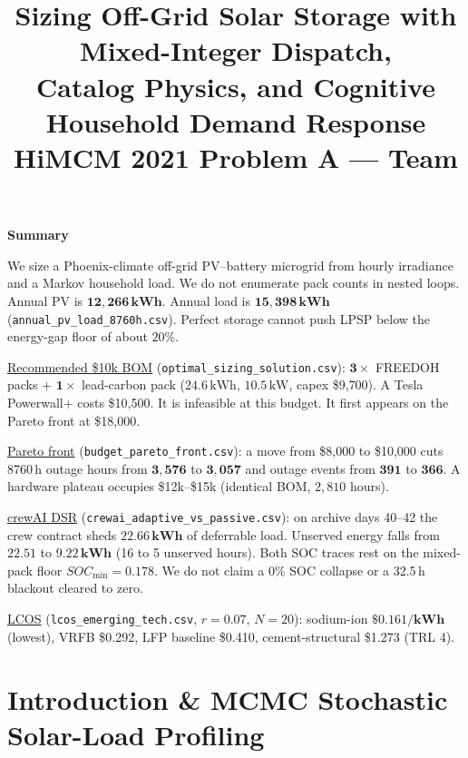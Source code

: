 \documentclass[12pt]{article}
\title{\textbf{Sizing Off-Grid Solar Storage with Mixed-Integer Dispatch,\\
Catalog Physics, and Cognitive Household Demand Response}\\[0.4em]
\large HiMCM 2021 Problem A --- Team \TeamNumber}
\author{}
\date{}
\begin{document}
\maketitle
\thispagestyle{empty}

\begin{center}
{\Large \textbf{Summary}}
\end{center}

\noindent
We size a Phoenix-climate off-grid PV--battery microgrid from hourly
irradiance and a Markov household load. We do not enumerate pack counts
in nested loops. Annual PV is \(\mathbf{12{,}266\,kWh}\). Annual load is
\(\mathbf{15{,}398\,kWh}\)
(\texttt{annual\_pv\_load\_8760h.csv}). Perfect storage cannot push LPSP
below the energy-gap floor of about \(20\%\).

\underline{Recommended \$10k BOM}
(\texttt{optimal\_sizing\_solution.csv}):
\(\mathbf{3\times}\) FREEDOH packs \(+\) \(\mathbf{1\times}\) lead-carbon
pack (\(24.6\,\mathrm{kWh}\), \(10.5\,\mathrm{kW}\), capex \$9{,}700).
A Tesla Powerwall+ costs \$10{,}500. It is infeasible at this budget.
It first appears on the Pareto front at \$18{,}000.

\underline{Pareto front} (\texttt{budget\_pareto\_front.csv}):
a move from \$8{,}000 to \$10{,}000 cuts 8760\,h outage hours from
\(\mathbf{3{,}576}\) to \(\mathbf{3{,}057}\) and outage events from
\(\mathbf{391}\) to \(\mathbf{366}\). A hardware plateau occupies
\$12k--\$15k (identical BOM, \(2{,}810\) hours).

\underline{crewAI DSR} (\texttt{crewai\_adaptive\_vs\_passive.csv}):
on archive days 40--42 the crew contract sheds
\(\mathbf{22.66\,kWh}\) of deferrable load. Unserved energy falls from
\(\mathbf{22.51}\) to \(\mathbf{9.22\,kWh}\) (16 to 5 unserved hours).
Both SOC traces rest on the mixed-pack floor \(SOC_{\min}=0.178\).
We do not claim a 0\% SOC collapse or a 32.5\,h blackout cleared to zero.

\underline{LCOS} (\texttt{lcos\_emerging\_tech.csv}, \(r=0.07\), \(N=20\)):
sodium-ion \(\mathbf{\$0.161/kWh}\) (lowest), VRFB \$0.292, LFP baseline
\$0.410, cement-structural \$1.273 (TRL 4).

\tableofcontents
\newpage

\section{Introduction \& MCMC Stochastic Solar-Load Profiling}
\end{document}
